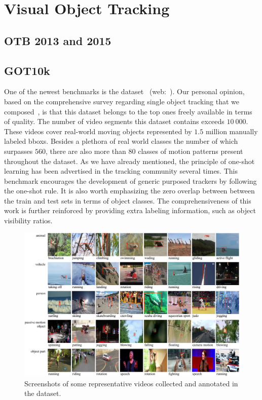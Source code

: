 \section{Visual Object Tracking}

\subsection{OTB 2013 and 2015}
\label{ssec:DatasetOTB1315}


\subsection{GOT10k}
\label{ssec:DatasetGOT10k}

One of the newest benchmarks is the  dataset~\cite{Huang2021} (web:~\cite{got10kdataset}). Our personal opinion, based on the comprehensive survey regarding single object tracking that we composed~\cite{Ondrasovic2021Siamese}, is that this dataset belongs to the top ones freely available in terms of quality. The number of video segments this dataset contains exceeds $10\ 000$. These videos cover real-world moving objects represented by $1.5$ million manually labeled \glspl{bbox}. Besides a plethora of real world classes the number of which surpasses $560$, there are also more than $80$ classes of motion patterns present throughout the dataset.
As we have already mentioned, the principle of one-shot learning has been advertised in the tracking community several times. This benchmark encourages the development of generic purposed trackers by following the one-shot rule. It is also worth emphasizing the zero overlap between between the train and test sets in terms of object classes. The comprehensiveness of this work is further reinforced by providing extra labeling information, such as object visibility ratios.

\begin{figure}[t]
    \centerline{\includegraphics[width=\linewidth]{figures/datasets/got10k_sample.pdf}}
    \caption[ dataset]{Screenshots of some representative videos collected and annotated in the  dataset. }
    \label{fig:DatasetGOT10k}
\end{figure}

